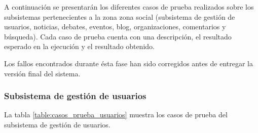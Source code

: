 A continuación se presentarán los diferentes casos de prueba realizados sobre los subsistemas pertenecientes a la zona zona social (subsistema de gestión de usuarios, noticias, debates, eventos, blog, organizaciones, comentarios y búsqueda).  Cada caso de prueba cuenta con una descripción, el resultado esperado en la ejecución y el resultado obtenido.

Los fallos encontrados durante ésta fase han sido corregidos antes de entregar la versión final del sistema.

\subsubsection{Subsistema de gestión de usuarios}
La tabla \ref{table:casos_prueba_usuarios} muestra los casos de prueba del subsistema de gestión de usuarios.


